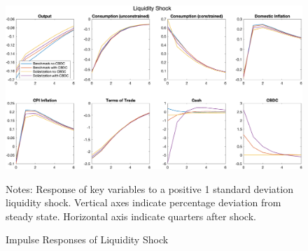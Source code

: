 \documentclass[12pt]{article}
\begin{document}
\begin{figure}[h!]
\label{IRF3}
\includegraphics[width=\textwidth]{Liquidity}
\caption{Impulse Responses of Liquidity Shock}
\scriptsize{Notes: Response of key variables to a positive 1 standard deviation liquidity shock. Vertical axes indicate percentage deviation from steady state. Horizontal axis indicate quarters after shock. }
\end{figure}
\end{document}
